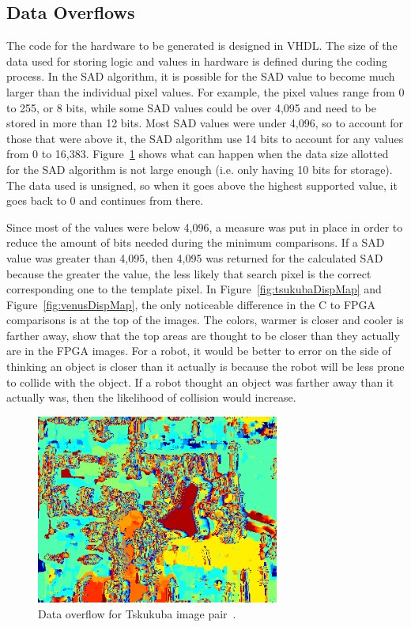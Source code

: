 \subsection{Data Overflows}
\label{sec:overflow}

The code for the hardware to be generated is designed in VHDL. The size of the data used for storing logic and values in hardware is defined during the coding process. In the SAD algorithm, it is possible for the SAD value to become much larger than the individual pixel values. For example, the pixel values range from 0 to 255, or 8 bits, while some SAD values could be over 4,095 and need to be stored in more than 12 bits. Most SAD values were under 4,096, so to account for those that were above it, the SAD algorithm use 14 bits to account for any values from 0 to 16,383. Figure~\ref{fig:overflow} shows what can happen when the data size allotted for the SAD algorithm is not large enough (i.e. only having 10 bits for storage). The data used is unsigned, so when it goes above the highest supported value, it goes back to 0 and continues from there.

Since most of the values were below 4,096, a measure was put in place in order to reduce the amount of bits needed during the minimum comparisons. If a SAD value was greater than 4,095, then 4,095 was returned for the calculated SAD because the greater the value, the less likely that search pixel is the correct corresponding one to the template pixel. In Figure~\ref{fig:tsukubaDispMap} and Figure~\ref{fig:venusDispMap}, the only noticeable difference in the C to FPGA comparisons is at the top of the images. The colors, warmer is closer and cooler is farther away, show that the top areas are thought to be closer than they actually are in the FPGA images. For a robot, it would be better to error on the side of thinking an object is closer than it actually is because the robot will be less prone to collide with the object. If a robot thought an object was farther away than it actually was, then the likelihood of collision would increase.

\begin{figure}[h]
	\begin{center}
		\includegraphics[width=80mm]{figures/tsukuba_disp9x9_2_sad_overflow.png}
		\captionfonts
		\caption{Data overflow for Tskukuba image pair~\cite{middlebury}.}
		\label{fig:overflow}
	\end{center}
\end{figure}

